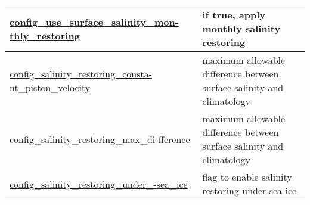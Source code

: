 {\begin{center}
\begin{longtable}{| p{2.0in} || p{4.0in} |}
    \hline
    \hyperref[subsec:nm_sec_config_use_surface_salinity_monthly_restoring]{config\_use\_surface\_salinity\_mon-}\hyperref[subsec:nm_sec_config_use_surface_salinity_monthly_restoring]{thly\_restoring}& if true, apply monthly salinity restoring \\
    \hline
    \hyperref[subsec:nm_sec_config_salinity_restoring_constant_piston_velocity]{config\_salinity\_restoring\_consta-}\hyperref[subsec:nm_sec_config_salinity_restoring_constant_piston_velocity]{nt\_piston\_velocity}& maximum allowable difference between surface salinity and climatology \\
    \hline
    \hyperref[subsec:nm_sec_config_salinity_restoring_max_difference]{config\_salinity\_restoring\_max\_di-}\hyperref[subsec:nm_sec_config_salinity_restoring_max_difference]{fference}& maximum allowable difference between surface salinity and climatology \\
    \hline
    \hyperref[subsec:nm_sec_config_salinity_restoring_under_sea_ice]{config\_salinity\_restoring\_under\_-}\hyperref[subsec:nm_sec_config_salinity_restoring_under_sea_ice]{sea\_ice}& flag to enable salinity restoring under sea ice \\
    \hline
\end{longtable}
\end{center}
}
